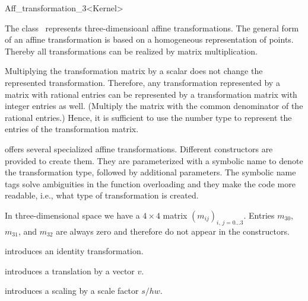 \begin{ccRefClass}{Aff_transformation_3<Kernel>}

\ccDefinition
The class \ccRefName\ represents three-dimensioanl affine transformations. 
The general form of an affine transformation is based on a homogeneous
representation of points. Thereby all transformations can be realized by
matrix multiplication. 

Multiplying the transformation matrix by a scalar does not change the
represented transformation. Therefore, any transformation represented
by a matrix with rational entries can be represented by a
transformation matrix with integer entries as well. (Multiply the
matrix with the common denominator of the rational entries.) Hence, it
is sufficient to use the number type  to represent
the entries of the transformation matrix.

{\cgal} offers several specialized affine transformations. Different
constructors are provided to create them. They are parameterized with
a symbolic name to denote the transformation type, followed by
additional parameters. The symbolic name tags solve ambiguities in the
function overloading and they make the code more readable, i.e., what
type of transformation is created.

In three-dimensional space we have a $4\times 4$ matrix
${(m_{ij})}_{i,\,j=0\ldots 3}$.  Entries $m_{30}$, $m_{31}$, and
$m_{32}$ are always zero and therefore do not appear in the
constructors.

\ccCreation
{}

            {introduces an identity transformation.}


            {introduces a translation by a vector $v$.}
 
            {introduces a scaling by a scale factor $s/hw$.}

\newsavebox{\arrthree}
\newsavebox{\arrlinthree}
\newsavebox{\transvecthree}



\end{ccRefClass}
